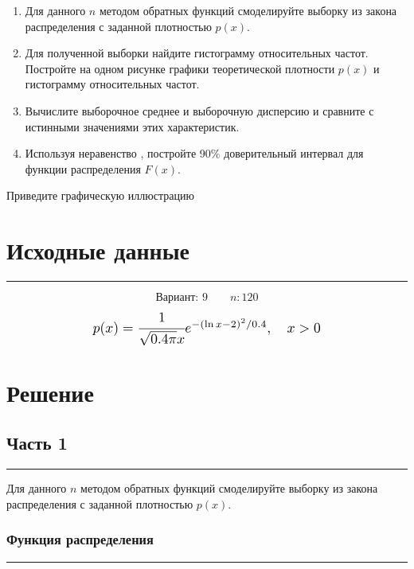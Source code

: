 \documentclass[a4paper, 14pt]{extarticle}
\begin{document}
\begin{enumerate}
  \item Для данного $n$ методом обратных функций смоделируйте выборку 
  из закона распределения с заданной плотностью  $p(x)$.
  \item Для полученной выборки найдите гистограмму относительных частот. 
  Постройте на одном рисунке графики теоретической плотности $p(x)$ и 
  гистограмму относительных частот.
  \item Вычислите выборочное среднее и выборочную дисперсию и сравните с 
  истинными значениями этих характеристик.
  \item Используя неравенство , 
  постройте 90\% доверительный интервал для функции распределения $F(x)$.
\end{enumerate}

Приведите графическую иллюстрацию

\section{Исходные данные}\vspace{-20pt}\rule{\linewidth}{0.1mm}

\begin{equation*}
  \text{Вариант: }9 \qquad n: 120
\end{equation*}
\begin{equation}
  \scalebox{1.25}{$p(x) = \cfrac{1}{\sqrt{0.4 \pi}x} e^{-(\ln{x} - 2)^2 / 0.4}, \quad x > 0$}
\end{equation}

\section{Решение}

\subsection{Часть 1}\vspace{-20pt}\rule{\linewidth}{0.1mm}
Для данного $n$ методом обратных функций смоделируйте выборку 
из закона распределения с заданной плотностью  $p(x)$.\\

\subsubsection{Функция распределения}\vspace{-20pt}\rule{\linewidth}{0.1mm}
\end{document}
